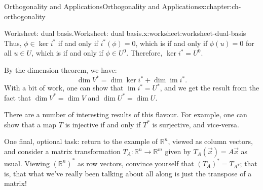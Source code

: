 \documentclass[oneside,10pt,]{book}
\numberwithin{equation}{section}
\newcommand{\R}{\mathbb{R}}
\begin{document}
\begin{chapterptx}{Orthogonality and Applications}{}{Orthogonality and Applications}{}{}{x:chapter:ch-orthogonality}
\begin{worksheet-section}{Worksheet: dual basis.}{}{Worksheet: dual basis.}{}{}{x:worksheet:worksheet-dual-basis}
\begin{equation*}
\end{equation*}
Thus, \(\phi\in \ker i^*\) if and only if \(i^*(\phi)=0\), which is if and only if \(\phi(u)=0\) for all \(u\in U\), which is if and only if \(\phi\in U^0\). Therefore, \(\ker i^* = U^0\).%
\par
By the dimension theorem, we have:%
\begin{equation*}
\dim V^* = \dim \ker i^* + \dim \operatorname{im} i^*\text{.}
\end{equation*}
With a bit of work, one can show that \(\operatorname{im} i^* = U^*\), and we get the result from the fact that \(\dim V^*=\dim V\) and \(\dim U^* = \dim U\).%
\par
There are a number of interesting results of this flavour. For example, one can show that a map \(T\) is injective if and only if \(T^*\) is surjective, and vice-versa.%
\par
One final, optional task: return to the example of \(\R^n\), viewed as column vectors, and consider a matrix transformation \(T_A:\R^n\to \R^m\) given by \(T_A(\vec{x}) = A\vec{x}\) as usual. Viewing \((\R^n)^*\) as row vectors, convince yourself that \((T_A)^* = T_{A^T}\); that is, that what we've really been talking about all along is just the transpose of a matrix!%
\end{worksheet-section}
\restoregeometry
\end{chapterptx}
%
%
\typeout{************************************************}
\typeout{************************************************}
%
\end{document}
